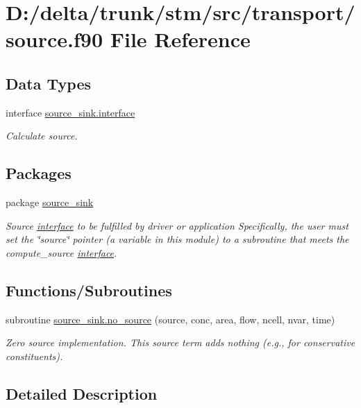 \hypertarget{a00019}{
\section{D:/delta/trunk/stm/src/transport/source.f90 File Reference}
\label{a00019}
}
\subsection*{Data Types}
\begin{CompactItemize}
\item 
interface \hyperlink{a00002}{source\_\-sink.interface}
\begin{CompactList}\small\item\em Calculate source. \item\end{CompactList}\end{CompactItemize}
\subsection*{Packages}
\begin{CompactItemize}
\item 
package \hyperlink{a00069}{source\_\-sink}
\begin{CompactList}\small\item\em Source \hyperlink{a00002}{interface} to be fulfilled by driver or application Specifically, the user must set the \char`\"{}source\char`\"{} pointer (a variable in this module) to a subroutine that meets the compute\_\-source \hyperlink{a00002}{interface}. \item\end{CompactList}

\end{CompactItemize}
\subsection*{Functions/Subroutines}
\begin{CompactItemize}
\item 
subroutine \hyperlink{a00069_55d2e6a4c1b1ffb79f6bc5b4e39b9c2c}{source\_\-sink.no\_\-source} (source, conc, area, flow, ncell, nvar, time)
\begin{CompactList}\small\item\em Zero source implementation. This source term adds nothing (e.g., for conservative constituents). \item\end{CompactList}\end{CompactItemize}


\subsection{Detailed Description}

